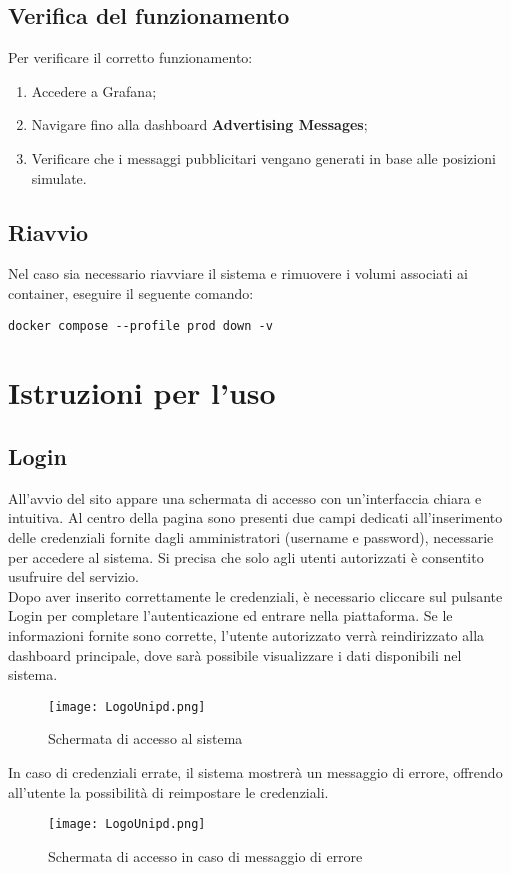 \documentclass[10pt]{article}
\begin{document}
\begin{justify}
\subsection{Verifica del funzionamento}
Per verificare il corretto funzionamento:
\begin{enumerate}
    \item Accedere a Grafana;
    \item Navigare fino alla dashboard \textbf{Advertising Messages};
    \item Verificare che i messaggi pubblicitari vengano generati in base alle posizioni simulate.
\end{enumerate}

\subsection{Riavvio}
Nel caso sia necessario riavviare il sistema e rimuovere i volumi associati ai container, eseguire il seguente comando:
\begin{verbatim}
docker compose --profile prod down -v
\end{verbatim}


\newpage
\section{Istruzioni per l'uso} %
\label{sec:uso}

\subsection{Login}
All'avvio del sito appare una schermata di accesso con un'interfaccia chiara e intuitiva. Al centro della pagina sono presenti due campi dedicati all'inserimento delle credenziali fornite dagli amministratori (username e password), necessarie per accedere al sistema. Si precisa che solo agli utenti autorizzati è consentito usufruire del servizio.\\
Dopo aver inserito correttamente le credenziali, è necessario cliccare sul pulsante Login per completare l'autenticazione ed entrare nella piattaforma. Se le informazioni fornite sono corrette, l'utente autorizzato verrà reindirizzato alla dashboard principale, dove sarà possibile visualizzare i dati disponibili nel sistema.\\
\begin{figure}[H]
    \centering
    \texttt{[image: LogoUnipd.png]}
    \caption{Schermata di accesso al sistema}
\end{figure}
\noindent
In caso di credenziali errate, il sistema mostrerà un messaggio di errore, offrendo all'utente la possibilità di reimpostare le credenziali.
\begin{figure}[H]
    \centering
    \texttt{[image: LogoUnipd.png]}
    \caption{Schermata di accesso in caso di messaggio di errore}
\end{figure}


\end{justify}
\end{document}
